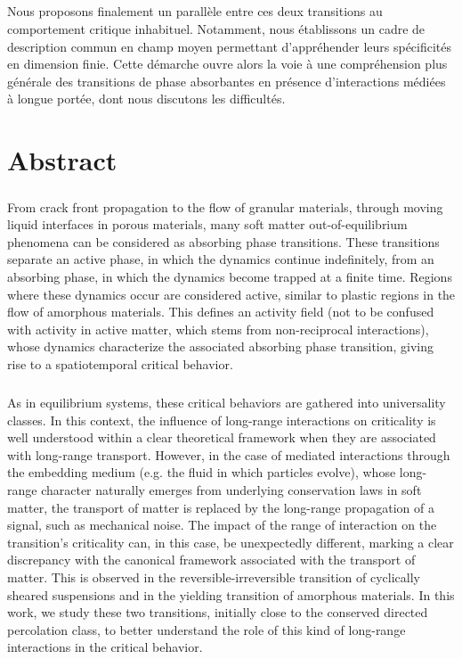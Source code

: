 \subparagraph{}Nous proposons finalement un parallèle entre ces deux transitions au comportement critique inhabituel. Notamment, nous établissons un cadre de description commun en champ moyen permettant d'appréhender leurs spécificités en dimension finie. Cette démarche ouvre alors la voie à une compréhension plus générale des transitions de phase absorbantes en présence d'interactions médiées à longue portée, dont nous discutons les difficultés.

\section*{Abstract}

\subparagraph{}From crack front propagation to the flow of granular materials, through moving liquid interfaces in porous materials, many soft matter out-of-equilibrium phenomena can be considered as absorbing phase transitions. These transitions separate an active phase, in which the dynamics continue indefinitely, from an absorbing phase, in which the dynamics become trapped at a finite time. Regions where these dynamics occur are considered active, similar to plastic regions in the flow of amorphous materials. This defines an activity field (not to be confused with activity in active matter, which stems from non-reciprocal interactions), whose dynamics characterize the associated absorbing phase transition, giving rise to a spatiotemporal critical behavior.

\subparagraph{}As in equilibrium systems, these critical behaviors are gathered into universality classes. In this context, the influence of long-range interactions on criticality is well understood within a clear theoretical framework when they are associated with long-range transport. However, in the case of mediated interactions through the embedding medium (e.g. the fluid in which particles evolve), whose long-range character naturally emerges from underlying conservation laws in soft matter, the transport of matter is replaced by the long-range propagation of a signal, such as mechanical noise. The impact of the range of interaction on the transition's criticality can, in this case, be unexpectedly different, marking a clear discrepancy with the canonical framework associated with the transport of matter. This is observed in the reversible-irreversible transition of cyclically sheared suspensions and in the yielding transition of amorphous materials. In this work, we study these two transitions, initially close to the conserved directed percolation class, to better understand the role of this kind of long-range interactions in the critical behavior.


